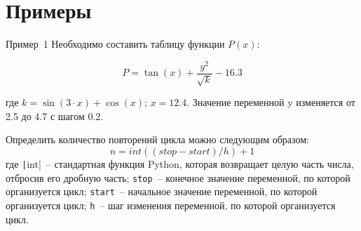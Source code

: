 \documentclass[aspectratio=169]{beamer}	%
\begin{document}
%
%
%    
%


\section{Примеры}
\sectionframe

\begin{frame}[fragile]{Пример~1}
\scriptsize
Необходимо составить таблицу функции $P(x)$:
\begin{Large}
\begin{equation*}
	P = \tan \left(x \right) + \dfrac{y^2}{\sqrt{k}} - 16.3
\end{equation*} 
\end{Large}
где $k = \sin \left(3 \cdot x\right) + \cos\left(x \right)$; \quad $x = 12.4$.
Значение переменной y изменяется от 2.5 до 4.7 с шагом 0.2. 

\bigskip
Определить количество повторений цикла можно следующим образом:
\begin{equation*}
	n = int \left(\left(stop - start\right)/h\right) + 1
\end{equation*}
где \texttt|int|~-- стандартная функция Python, которая возвращает целую часть числа, отбросив его дробную часть; \texttt{stop}~-- конечное значение переменной, по которой организуется цикл; \texttt{start}~-- начальное значение переменной, по которой организуется цикл; \texttt{h}~-- шаг изменения переменной, по которой организуется цикл.
\vfill
\end{frame}
\end{document}
